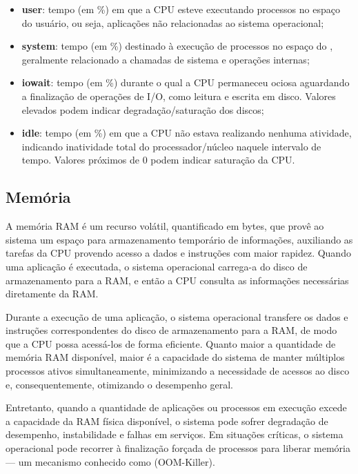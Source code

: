 \begin{itemize}
\item \textbf{user}: tempo (em \%) em que a CPU esteve executando processos no espaço do usuário, ou seja, aplicações não relacionadas ao sistema operacional;

\item \textbf{system}: tempo (em \%) destinado à execução de processos no espaço do , geralmente relacionado a chamadas de sistema e operações internas;

\item \textbf{iowait}: tempo (em \%) durante o qual a CPU permaneceu ociosa aguardando a finalização de operações de I/O, como leitura e escrita em disco. Valores elevados podem indicar degradação/saturação dos discos;

\item \textbf{idle}: tempo (em \%) em que a CPU não estava realizando nenhuma atividade, indicando inatividade total do processador/núcleo naquele intervalo de tempo. Valores próximos de 0 podem indicar saturação da CPU.
\end{itemize}

\subsection{Memória}
\label{subsection:Memoria}

A memória RAM \citep{memorymetrics2025} é um recurso volátil, quantificado em bytes, que provê ao sistema um espaço para armazenamento temporário de informações, auxiliando as tarefas da CPU provendo acesso a dados e instruções com maior rapidez. Quando uma aplicação é executada, o sistema operacional carrega-a do disco de armazenamento para a RAM, e então a CPU consulta as informações necessárias diretamente da RAM. 

Durante a execução de uma aplicação, o sistema operacional transfere os dados e instruções correspondentes do disco de armazenamento para a RAM, de modo que a CPU possa acessá-los de forma eficiente. Quanto maior a quantidade de memória RAM disponível, maior é a capacidade do sistema de manter múltiplos processos ativos simultaneamente, minimizando a necessidade de acessos ao disco e, consequentemente, otimizando o desempenho geral.

Entretanto, quando a quantidade de aplicações ou processos em execução excede a capacidade da RAM física disponível, o sistema pode sofrer degradação de desempenho, instabilidade e falhas em serviços. Em situações críticas, o sistema operacional pode recorrer à finalização forçada de processos para liberar memória --- um mecanismo conhecido como  (OOM-Killer).

